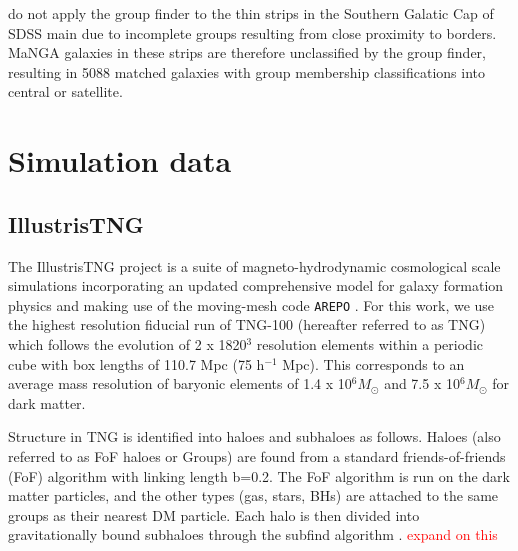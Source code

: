 \documentclass[fleqn,usenatbib]{mnras}
\newcommand{\red}[1]{{\textcolor{red}{#1}}}
\begin{document}


\citet{lim2017} do not apply the group finder to the thin strips in the Southern Galatic Cap of SDSS main due to incomplete groups resulting from close proximity to borders. MaNGA galaxies in these strips are therefore unclassified by the group finder, resulting in 5088 matched galaxies with group membership classifications into central or satellite. 

\section{Simulation data} \label{sec:sim_data}
\subsection{IllustrisTNG}
The IllustrisTNG project \citep{marinacci18,naiman18,nelson18,pillepich18b,springel18} is a suite of magneto-hydrodynamic cosmological scale simulations incorporating an updated comprehensive model for galaxy formation physics \citep[as decribed in; ][]{weinberger17,pillepich18a} and making use of the moving-mesh code \texttt{AREPO} \citep{springel10,pakmor11,pakmor13}. For this work, we use the highest resolution fiducial run of TNG-100 (hereafter referred to as TNG) which follows the evolution of 2 x 1820$^3$ resolution elements within a periodic cube with box lengths of 110.7 Mpc (75 h$^{-1}$ Mpc). This corresponds to an average mass resolution of baryonic elements of 1.4 x 10$^6 M_{\odot}$ and 7.5 x 10$^6 M_{\odot}$ for dark matter. 

Structure in TNG is identified into haloes and subhaloes as follows. Haloes (also referred to as FoF haloes or Groups) are found from a standard friends-of-friends (FoF) algorithm \citep{davis85} with linking length b=0.2. The FoF algorithm is run on the dark matter particles, and the other types (gas, stars, BHs) are attached to the same groups as their nearest DM particle. Each halo is then divided into gravitationally bound subhaloes through the subfind algorithm \citep{springel01}. \red{expand on this}
\end{document}
